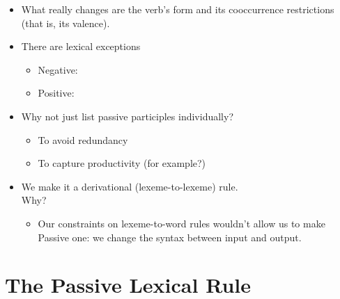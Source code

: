 \documentclass[a4paper,landscape,headrule,footrule]{foils}
\begin{document}


\begin{itemize}
\item What really changes are the verb’s form and its 
cooccurrence restrictions (that is, its valence).
\item There are lexical exceptions
  \begin{itemize}
  \item Negative:  
    \begin{exe}
      \ex {}
      \ex {}
      \ex {}
      \ex {}
    \end{exe}
  \item Positive:
    \begin{exe}
      \ex {}
      \ex {}
    \end{exe}
  \end{itemize}
\end{itemize}  


\begin{itemize}
\item Why not just list passive participles individually?
  \begin{itemize}
  \item To avoid redundancy
  \item To capture productivity (for example?)
  \end{itemize}
\item We make it a derivational (lexeme-to-lexeme) rule.  
  \\ Why?
  \begin{itemize}
  \item Our constraints on lexeme-to-word rules wouldn’t allow 
    us to make Passive one: we change the syntax between input and output.
  \end{itemize}
\end{itemize}  

\section[The Passive Lexical Rule: passives of intransitives, input and output]{The Passive Lexical Rule}

\end{document}
